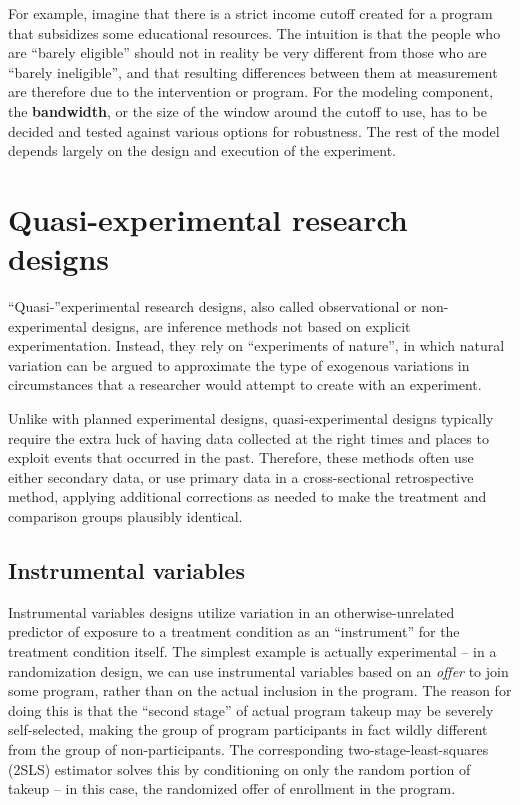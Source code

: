 For example, imagine that there is a strict income cutoff created
for a program that subsidizes some educational resources.
The intuition is that the people who are ``barely eligible''
should not in reality be very different from those who are ``barely ineligible'',
and that resulting differences between them at measurement
are therefore due to the intervention or program.
For the modeling component, the \textbf{bandwidth},
or the size of the window around the cutoff to use,
has to be decided and tested against various options for robustness.
The rest of the model depends largely on the design and execution of the experiment.


\section{Quasi-experimental research designs}

``Quasi-''experimental research designs,
also called observational or non-experimental designs,
are inference methods not based on explicit experimentation.
Instead, they rely on ``experiments of nature'',
in which natural variation can be argued to approximate
the type of exogenous variations in circumstances
that a researcher would attempt to create with an experiment.

Unlike with planned experimental designs,
quasi-experimental designs typically require the extra luck
of having data collected at the right times and places
to exploit events that occurred in the past.
Therefore, these methods often use either secondary data,
or use primary data in a cross-sectional retrospective method,
applying additional corrections as needed to make
the treatment and comparison groups plausibly identical.

\subsection{Instrumental variables}

Instrumental variables designs utilize variation in an
otherwise-unrelated predictor of exposure to a treatment condition
as an ``instrument'' for the treatment condition itself.
The simplest example is actually experimental --
in a randomization design, we can use instrumental variables
based on an \textit{offer} to join some program,
rather than on the actual inclusion in the program.
The reason for doing this is that the ``second stage''
of actual program takeup may be severely self-selected,
making the group of program participants in fact
wildly different from the group of non-participants.
The corresponding two-stage-least-squares (2SLS) estimator
solves this by conditioning on only the random portion of takeup --
in this case, the randomized offer of enrollment in the program.

